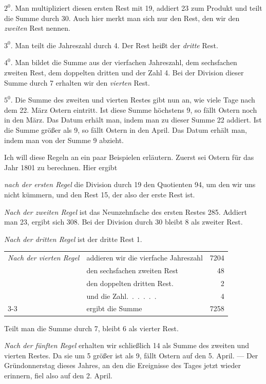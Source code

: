 $2^{0}$. Man multipliziert diesen ersten Rest mit 19, addiert 23 zum Produkt und teilt die Summe durch 30. Auch hier merkt man sich nur den Rest, den wir den \textit{zweiten} Rest nennen.

$3^{0}$. Man teilt die Jahreszahl durch 4. Der Rest heißt der \textit{dritte} Rest.

$4^{0}$. Man bildet die Summe aus der vierfachen Jahreszahl, dem sechsfachen zweiten Rest, dem doppelten dritten und der Zahl 4. Bei der Division dieser Summe durch 7 erhalten wir den \textit{vierten} Rest.

$5^{0}$. Die Summe des zweiten und vierten Restes gibt nun an, wie viele Tage nach dem 22. März Ostern eintritt. Ist diese Summe höchstens 9, so fällt Ostern noch in den März. Das Datum erhält man, indem man zu dieser Summe 22 addiert. Ist die Summe größer als 9, so fällt Ostern in den April. Das Datum erhält man, indem man von der Summe 9 abzieht.

Ich will diese Regeln an ein paar Beispielen erläutern. Zuerst sei Ostern für das Jahr 1801 zu berechnen. Hier ergibt

\textit{nach der ersten Regel} die Division durch 19 den Quotienten 94, um den wir uns nicht kümmern, und den Rest 15, der also der erste Rest ist.

\textit{Nach der zweiten Regel} ist das Neunzehnfache des ersten Restes 285. Addiert man 23, ergibt sich 308. Bei der Division durch 30 bleibt 8 als zweiter Rest.

\textit{Nach der dritten Regel} ist der dritte Rest 1.
%

\begin{center}\small
\begin{tabular}{llr}
\textit{Nach der vierten Regel} & addieren wir die vierfache Jahreszahl &7204\\
& den sechsfachen zweiten Rest &48\\
& den doppelten dritten Rest\quad . &2\\
& und die Zahl\quad .\ .\ .\ .\ .\ . &4\\\cline{3-3}
&\hfill ergibt die Summe &7258
\end{tabular}
\end{center}
Teilt man die Summe durch 7, bleibt 6 als vierter Rest.

\textit{Nach der fünften Regel} erhalten wir schließlich 14 als Summe des zweiten und vierten Restes. Da sie um 5 größer ist als 9, fällt Ostern auf den 5. April. — Der Gründonnerstag dieses Jahres, an den die Ereignisse des Tages jetzt wieder erinnern, fiel also auf den 2. April.

